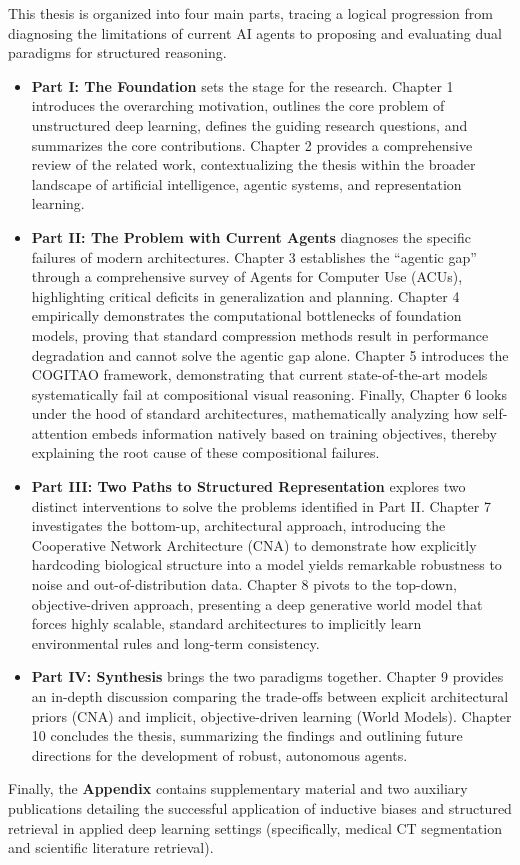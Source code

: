 This thesis is organized into four main parts, tracing a logical progression from diagnosing the limitations of current AI agents to proposing and evaluating dual paradigms for structured reasoning.

\begin{itemize}
    \item \textbf{Part I: The Foundation} sets the stage for the research. Chapter 1 introduces the overarching motivation, outlines the core problem of unstructured deep learning, defines the guiding research questions, and summarizes the core contributions. Chapter 2 provides a comprehensive review of the related work, contextualizing the thesis within the broader landscape of artificial intelligence, agentic systems, and representation learning.
    
    \item \textbf{Part II: The Problem with Current Agents} diagnoses the specific failures of modern architectures. Chapter 3 establishes the ``agentic gap'' through a comprehensive survey of Agents for Computer Use (ACUs), highlighting critical deficits in generalization and planning. Chapter 4 empirically demonstrates the computational bottlenecks of foundation models, proving that standard compression methods result in performance degradation and cannot solve the agentic gap alone. Chapter 5 introduces the COGITAO framework, demonstrating that current state-of-the-art models systematically fail at compositional visual reasoning. Finally, Chapter 6 looks under the hood of standard architectures, mathematically analyzing how self-attention embeds information natively based on training objectives, thereby explaining the root cause of these compositional failures.
    
    \item \textbf{Part III: Two Paths to Structured Representation} explores two distinct interventions to solve the problems identified in Part II. Chapter 7 investigates the bottom-up, architectural approach, introducing the Cooperative Network Architecture (CNA) to demonstrate how explicitly hardcoding biological structure into a model yields remarkable robustness to noise and out-of-distribution data. Chapter 8 pivots to the top-down, objective-driven approach, presenting a deep generative world model that forces highly scalable, standard architectures to implicitly learn environmental rules and long-term consistency.
    
    \item \textbf{Part IV: Synthesis} brings the two paradigms together. Chapter 9 provides an in-depth discussion comparing the trade-offs between explicit architectural priors (CNA) and implicit, objective-driven learning (World Models). Chapter 10 concludes the thesis, summarizing the findings and outlining future directions for the development of robust, autonomous agents.
\end{itemize}

Finally, the \textbf{Appendix} contains supplementary material and two auxiliary publications detailing the successful application of inductive biases and structured retrieval in applied deep learning settings (specifically, medical CT segmentation and scientific literature retrieval).